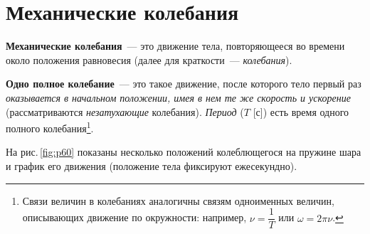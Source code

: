 \documentclass[main.tex]{subfiles}
\begin{document}

 

 

\setcounter{section}{35
}
\addtocounter{section}{-1} 

\section{Механические колебания}

\textbf{Механические колебания}~--- это движение тела, повторяющееся во времени около положения равновесия (далее для краткости~--- \emph{колебания}).

\textbf{Одно полное колебание}~--- это такое движение, после которого тело первый раз \emph{оказывается в начальном положении, имея в нем те же скорость и ускорение} (рассматриваются \emph{незатухающие} колебания). \emph{Период} ($T$ [с]) есть время одного полного колебания\footnote{Связи величин в колебаниях аналогичны связям одноименных величин, описывающих движение по окружности: например, $\nu=\dfrac{1}{T}$ или $\omega=2\pi\nu$.}. 


На рис.\,\ref{fig:p60} показаны несколько положений колеблющегося на пружине шара и график его движения (положение тела фиксируют ежесекундно).
\end{document}
